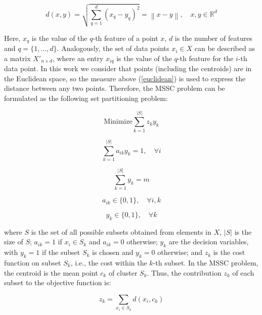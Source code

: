 \begin{equation}
\label{euclidean}
d(x,y) = \sqrt{\sum_{q=1}^{d}(x_{q} - y_{q})^2} = \left \| x - y \right \|, \quad x, y \in \mathbb{R}^d
\end{equation}

Here, $x_{q}$ is the value of the $q$-th feature of a point $x$, $d$ is the number of features and $q = \{1,...,d\}$. Analogously, the set of data points $x_i \in X$ can be described as a matrix $X'_{n \times d}$, where an entry $x_{iq}$ is the value of the $q$-th feature for the $i$-th data point. In this work we consider that points (including the centroids) are in the Euclidean space, so the measure above (\ref{euclidean}) is used to express the distance between any two points. Therefore, the MSSC problem can be formulated as the following set partitioning problem:

\begin{equation} \label{eq:of}
\textrm{Minimize} \sum_{k=1}^{\left | S \right |}z_k y_k
\end{equation}

\begin{equation}
\sum_{k=1}^{\left | S \right |}a_{ik}y_k = 1, \quad \forall i
\end{equation}

\begin{equation}
\sum_{k=1}^{\left | S \right |}y_k = m
\end{equation}

\begin{equation}
a_{ik} \in \{0,1\}, \quad \forall i,k
\end{equation}

\begin{equation}
y_k \in \{0,1\}, \quad \forall k
\end{equation}

\noindent where $S$ is the set of all possible subsets obtained from elements in $X$, $\left | S \right |$ is the size of $S$; $a_{ik} = 1$ if $x_i \in S_k$ and $a_{ik} = 0$ otherwise; $y_k$ are the decision variables, with $y_k = 1$ if the subset $S_k$ is chosen and $y_k = 0$ otherwise; and $z_k$ is the cost function on subset $S_k$, i.e., the cost within the $k$-th subset. In the MSSC problem, the centroid is the mean point $c_k$ of cluster $S_k$. Thus, the contribution $z_k$ of each subset to the objective function is:

\begin{equation}
z_k = \sum_{x_i \in S_k} d(x_i, c_k)
\end{equation}


